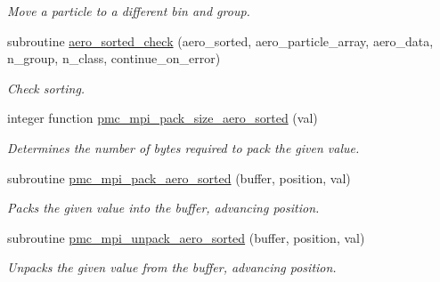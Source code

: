 \begin{DoxyCompactItemize}
\begin{DoxyCompactList}\small\item\em Move a particle to a different bin and group. \end{DoxyCompactList}\item 
subroutine \mbox{\hyperlink{namespacepmc__aero__sorted_a3b355838730db411ca1190e2c8fb99a4}{aero\+\_\+sorted\+\_\+check}} (aero\+\_\+sorted, aero\+\_\+particle\+\_\+array, aero\+\_\+data, n\+\_\+group, n\+\_\+class, continue\+\_\+on\+\_\+error)
\begin{DoxyCompactList}\small\item\em Check sorting. \end{DoxyCompactList}\item 
integer function \mbox{\hyperlink{namespacepmc__aero__sorted_a469c7678b144002576c666dc3bbfd51f}{pmc\+\_\+mpi\+\_\+pack\+\_\+size\+\_\+aero\+\_\+sorted}} (val)
\begin{DoxyCompactList}\small\item\em Determines the number of bytes required to pack the given value. \end{DoxyCompactList}\item 
subroutine \mbox{\hyperlink{namespacepmc__aero__sorted_afdb70af4eedda6bd45f561864a348175}{pmc\+\_\+mpi\+\_\+pack\+\_\+aero\+\_\+sorted}} (buffer, position, val)
\begin{DoxyCompactList}\small\item\em Packs the given value into the buffer, advancing position. \end{DoxyCompactList}\item 
subroutine \mbox{\hyperlink{namespacepmc__aero__sorted_a42d37f6234ca8cc529ffc5a90c80e85c}{pmc\+\_\+mpi\+\_\+unpack\+\_\+aero\+\_\+sorted}} (buffer, position, val)
\begin{DoxyCompactList}\small\item\em Unpacks the given value from the buffer, advancing position. \end{DoxyCompactList}\end{DoxyCompactItemize}
